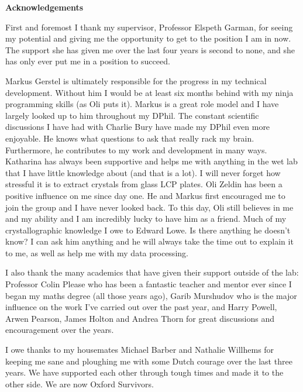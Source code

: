\newenvironment{acknowledgements}%
{\clearpage\thispagestyle{empty}\vfill\begin{center}%
\bfseries Acknowledgements\end{center}}%
{\vfill}
\begin{acknowledgements}
\small
\singlespacing
First and foremost I thank my supervisor, Professor Elspeth Garman, for seeing my potential and giving me the opportunity to get to the position I am in now.
The support she has given me over the last four years is second to none, and she has only ever put me in a position to succeed.

Markus Gerstel is ultimately responsible for the progress in my technical development.
Without him I would be at least six months behind with my ninja programming skills (as Oli puts it).
Markus is a great role model and I have largely looked up to him throughout my DPhil.
The constant scientific discussions I have had with Charlie Bury have made my DPhil even more enjoyable.
He knows what questions to ask that really rack my brain.
Furthermore, he contributes to my work and development in many ways.
Katharina has always been supportive and helps me with anything in the wet lab that I have little knowledge about (and that is a lot).
I will never forget how stressful it is to extract crystals from glass LCP plates.
Oli Zeldin has been a positive influence on me since day one.
He and Markus first encouraged me to join the group and I have never looked back.
To this day, Oli still believes in me and my ability and I am incredibly lucky to have him as a friend.
Much of my crystallographic knowledge I owe to Edward Lowe.
Is there anything he doesn't know?
I can ask him anything and he will always take the time out to explain it to me, as well as help me with my data processing.

I also thank the many academics that have given their support outside of the lab:
Professor Colin Please who has been a fantastic teacher and mentor ever since I began my maths degree (all those years ago), Garib Murshudov who is the major influence on the work I've carried out over the past year, and Harry Powell, Arwen Pearson, James Holton and Andrea Thorn for great discussions and encouragement over the years.

I owe thanks to my housemates Michael Barber and Nathalie Willhems for keeping me sane and ploughing me with some Dutch courage over the last three years. We have supported each other through tough times and made it to the other side. We are now Oxford Survivors.


\end{acknowledgements}
